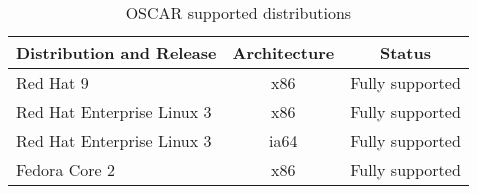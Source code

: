 %
%
%

\begin{table}[htbp]
  \begin{center}
    \begin{tabular}{|l|c|p{3in}|}
      \hline
      \multicolumn{1}{|c|}{Distribution and Release} &
      \multicolumn{1}{|c|}{Architecture} &
      \multicolumn{1}{|c|}{Status} \\
      \hline
      \hline
      Red Hat 9 & x86 &Fully supported \\
%
      Red Hat Enterprise Linux 3 & x86 & Fully supported \\
%
      Red Hat Enterprise Linux 3 & ia64 & Fully supported \\
%
\hline
%
      Fedora Core 2 & x86 & Fully supported \\
%
\hline
%
    \end{tabular}
    \caption{OSCAR supported distributions}
    \label{tab:oscar-distro-support}
  \end{center}
\end{table}
